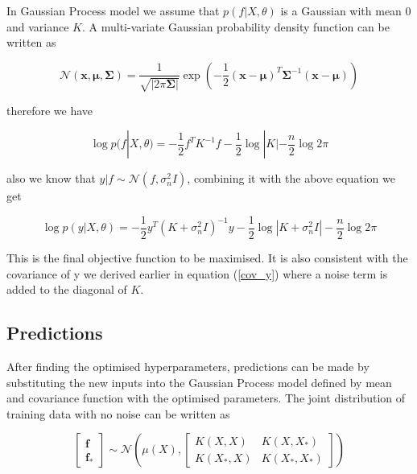 \documentclass[14pt]{report}
\numberwithin{equation}{chapter}
\begin{document}
\begin{spacing}{2}
In Gaussian Process model we assume that $p(f|X,\theta)$ is a Gaussian with mean 0 and variance $K$. A multi-variate Gaussian probability density function can be written as 

\[\mathcal{N}(\mathbf{x},\mathbf{\mu},\mathbf{\Sigma}) = \frac{1}{\sqrt{|2\pi\mathbf{\Sigma}|}}\operatorname{exp}\left(-\frac{1}{2}(\mathbf{x} - \mathbf{\mu})^T\mathbf{\Sigma}^{-1}(\mathbf{x} - \mathbf{\mu})\right)\]

therefore we have

\begin{equation}
\label{f_posterior}
\operatorname{log}p(f|X,\theta) = -\frac{1}{2}f^TK^{-1}f-\frac{1}{2}\operatorname{log}|K| - \frac{n}{2}\operatorname{log}2\pi
\end{equation}

also we know that $y|f\sim \mathcal{N}\left(f,\sigma_n^2 I\right)$, combining it with the above equation we get

\begin{equation}
\operatorname{log}p(y|X,\theta) = -\frac{1}{2}y^T(K+\sigma_n^2 I)^{-1}y - \frac{1}{2}\operatorname{log}\left|K+\sigma_n^2 I\right|- \frac{n}{2}\operatorname{log}2\pi
\end{equation}

This is the final objective function to be maximised. It is also consistent with the covariance of y we derived earlier in equation (\ref{cov_y}) where a noise term is added to the diagonal of $K$.


\subsection{Predictions}
After finding the optimised hyperparameters, predictions can be made by substituting the new inputs into the Gaussian Process model defined by mean and covariance function with the optimised parameters. The joint distribution of training data with no noise can be written as 

\begin{equation}
\left[\begin{array}{c} 
\mathbf{f} \\
\mathbf{f}_\ast \end{array}
 \right] \sim \mathcal{N} 
 \left(\mu(X), \left[\begin{array}{cc}
 K(X, X) & K(X, X_\ast)\\
 K(X_\ast, X) & K(X_\ast, X_\ast)
 \end{array}\right]\right)
\end{equation} 


\end{spacing}
\end{document}
